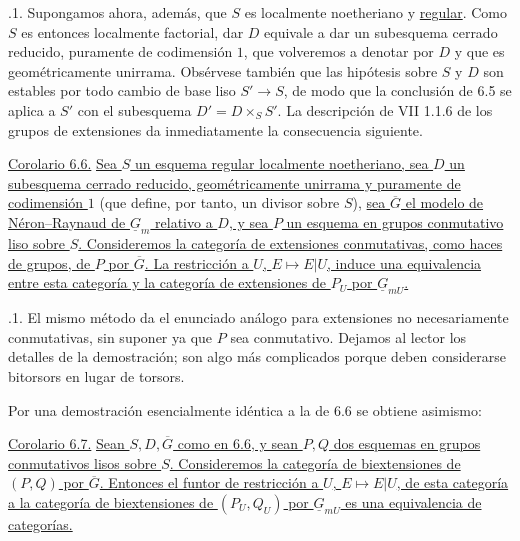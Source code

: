 
\medskip
{}.1. Supongamos ahora, además, que $S$ es localmente
noetheriano y \underline{regular}. Como $S$ es entonces localmente
factorial, dar $D$ equivale a dar un subesquema cerrado reducido,
puramente de codimensión $1$, que volveremos a denotar por $D$ y que es
geométricamente unirrama. Obsérvese también que las hipótesis sobre $S$
y $D$ son estables por todo cambio de base liso $S'\to S$, de modo que
la conclusión de 6.5 se aplica a $S'$ con el subesquema
$D'=D\times_S S'$. La descripción de VII 1.1.6 de los grupos de
extensiones da inmediatamente la consecuencia siguiente.

\medskip
\noindent\underline{Corolario 6.6.} \underline{Sea $S$ un esquema
regular localmente noetheriano, sea $D$ un subesquema cerrado reducido,
geométricamente unirrama y puramente de codimensión $1$} (que define,
por tanto, un divisor sobre $S$), \underline{sea $\overline G$ el
modelo de Néron--Raynaud de $\underline G_m$ relativo a $D$, y sea $P$
un esquema en grupos conmutativo liso sobre $S$. Consideremos la
categoría de extensiones conmutativas, como haces de grupos, de $P$ por
$\overline G$. La restricción a $U$, $E\mapsto E|U$, induce una
equivalencia entre esta categoría y la categoría de extensiones de
$P_U$ por $\underline G_{mU}$.}

\medskip
{}.1. El mismo método da el enunciado análogo para
extensiones no necesariamente conmutativas, sin suponer ya que $P$ sea
conmutativo. Dejamos al lector los detalles de la demostración; son
algo más complicados porque deben considerarse bitorsors en lugar de
torsors.

Por una demostración esencialmente idéntica a la de 6.6 se obtiene
asimismo:


\medskip
\noindent\underline{Corolario 6.7.} \underline{Sean
$S,D,\overline G$ como en 6.6, y sean $P,Q$ dos esquemas en grupos
conmutativos lisos sobre $S$. Consideremos la categoría de
biextensiones de $(P,Q)$ por $\overline G$. Entonces el funtor de
restricción a $U$, $E\mapsto E|U$, de esta categoría a la categoría de
biextensiones de $(P_U,Q_U)$ por $\underline G_{mU}$ es una
equivalencia de categorías.}
